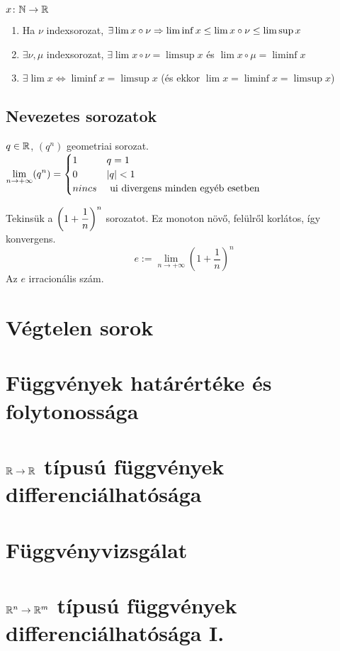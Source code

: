 \begin{te} $x\colon\mathbb{N}\to\mathbb{R}$
  \begin{enumerate}
  \item   Ha $\nu$ indexsorozat, $\exists\lim x\circ \nu\Rightarrow \liminf x\leq \lim x\circ\nu\leq \limsup x$
  \item   $\exists\nu,\mu$ indexsorozat, $\exists\lim x\circ \nu=\limsup x$ és $\lim x\circ\mu = \liminf x$
  \item    $\exists \lim x\iff \liminf x= \limsup x$ (és ekkor $\lim x=\liminf x=\limsup x$)
  \end{enumerate}
\end{te}
\subsection{Nevezetes sorozatok}
\begin{de}
  $q\in\mathbb{R}$, $(q^n)$ geometriai sorozat.\\
  $\displaystyle\lim_{n\to+\infty} (q^n)=\begin{cases}1& q=1\\0 & \vert q\vert < 1\\nincs & \text{ ui divergens minden egyéb esetben}
  \end{cases}$
\end{de}
\begin{de}[$e$ bevezetése] Tekinsük a $\displaystyle\left(1+\dfrac1n\right)^n$ sorozatot. Ez monoton növő, felülről korlátos, így
  konvergens.
  \[e:=\lim_{n\to+\infty}\left(1+\dfrac1n\right)^n\]
  Az $e$ irracionális szám.
\end{de}
\newpage
\section{Végtelen sorok}
\section{Függvények határértéke és folytonossága}
\section{$\mathbb{R}\to\mathbb{R}$ típusú függvények differenciálhatósága}
\section{Függvényvizsgálat}

\newpage
\section{$\mathbb{R}^n\to\mathbb{R}^m$ típusú függvények differenciálhatósága I.}

